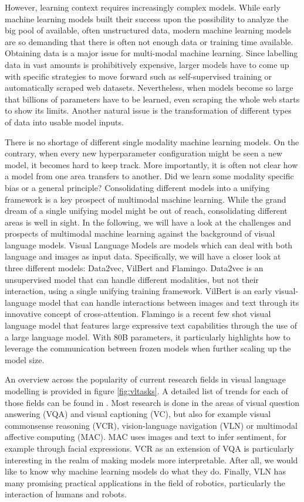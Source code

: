 \documentclass[
]{krantz}
\begin{document}
However, learning context requires increasingly complex models. While early machine learning models built their success upon the possibility to analyze the big pool of available, often unstructured data, modern machine learning models are so demanding that there is often not enough data or training time available. Obtaining data is a major issue for multi-modal machine learning. Since labelling data in vast amounts is prohibitively expensive, larger models have to come up with specific strategies to move forward such as self-supervised training or automatically scraped web datasets. Nevertheless, when models become so large that billions of parameters have to be learned, even scraping the whole web starts to show its limits. Another natural issue is the transformation of different types of data into usable model inputs.

There is no shortage of different single modality machine learning models. On the contrary, when every new hyperparameter configuration might be seen a new model, it becomes hard to keep track. More importantly, it is often not clear how a model from one area transfers to another. Did we learn some modality specific bias or a general principle? Consolidating different models into a unifying framework is a key prospect of multimodal machine learning. While the grand dream of a single unifying model might be out of reach, consolidating different areas is well in sight. In the following, we will have a look at the challenges and prospects of multimodal machine learning against the background of visual language models. Visual Language Models are models which can deal with both language and images as input data. Specifically, we will have a closer look at three different models: Data2vec, VilBert and Flamingo. Data2vec is an unsupervised model that can handle different modalities, but not their interaction, using a single unifying training framework. VilBert is an early visual-language model that can handle interactions between images and text through its innovative concept of cross-attention. Flamingo is a recent few shot visual language model that features large expressive text capabilities through the use of a large language model. With 80B parameters, it particularly highlights how to leverage the communication between frozen models when further scaling up the model size.

An overview across the popularity of current research fields in visual language modelling is provided in figure \ref{fig:vltasks}. A detailed list of trends for each of those fields can be found in \citet{uppal2022multimodal}. Most research is done in the areas of visual question answering (VQA) and visual captioning (VC), but also for example visual commonsense reasoning (VCR), vision-language navigation (VLN) or multimodal affective computing (MAC). MAC uses images and text to infer sentiment, for example through facial expressions. VCR as an extension of VQA is particularly interesting in the realm of making models more interpretable. After all, we would like to know why machine learning models do what they do. Finally, VLN has many promising practical applications in the field of robotics, particularly the interaction of humans and robots.
\end{document}
